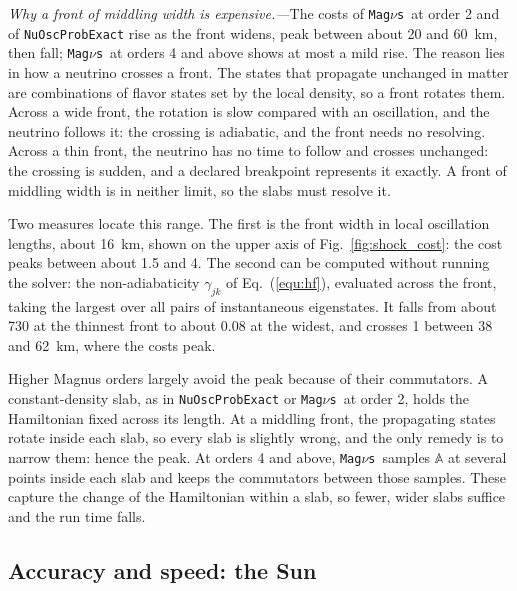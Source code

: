 \documentclass[final,5p,times,twocolumn,sort,compress]{elsarticle}
\makeatletter
\newcommand{\eq}{Eq.}
\newcommand{\fig}{Fig.}
\DeclareRobustCommand{\_}{%
  \ifmmode\nfss@text{\textunderscore}\else\textunderscore\allowbreak\fi}
\newcommand{\equ}[1]{\eq~(\ref{equ:#1})}
\newcommand{\figu}[1]{\fig~\ref{fig:#1}}
\newcommand{\magnus}{{\tt Mag}\ensuremath{\nu}{\tt s}}
\makeatother
\begin{document}
\smallskip

\textit{Why a front of middling width is expensive.---}The costs of \magnus\ at order 2 and of {\tt NuOscProbExact} rise as the front widens, peak between about 20 and 60~km, then fall; \magnus\ at orders 4 and above shows at most a mild rise. The reason lies in how a neutrino crosses a front. The states that propagate unchanged in matter are combinations of flavor states set by the local density, so a front rotates them. Across a wide front, the rotation is slow compared with an oscillation, and the neutrino follows it: the crossing is adiabatic, and the front needs no resolving. Across a thin front, the neutrino has no time to follow and crosses unchanged: the crossing is sudden, and a declared breakpoint represents it exactly. A front of middling width is in neither limit, so the slabs must resolve it.

Two measures locate this range. The first is the front width in local oscillation lengths, about 16~km, shown on the upper axis of \figu{shock_cost}: the cost peaks between about 1.5 and 4. The second can be computed without running the solver: the non-adiabaticity $\gamma_{jk}$ of \equ{hf}, evaluated across the front, taking the largest over all pairs of instantaneous eigenstates. It falls from about 730 at the thinnest front to about 0.08 at the widest, and crosses 1 between 38 and 62~km, where the costs peak.

Higher Magnus orders largely avoid the peak because of their commutators. A constant-density slab, as in {\tt NuOscProbExact} or \magnus\ at order 2, holds the Hamiltonian fixed across its length. At a middling front, the propagating states rotate inside each slab, so every slab is slightly wrong, and the only remedy is to narrow them: hence the peak. At orders 4 and above, \magnus\ samples $\mathbb{A}$ at several points inside each slab and keeps the commutators between those samples. These capture the change of the Hamiltonian within a slab, so fewer, wider slabs suffice and the run time falls.


\subsection{Accuracy and speed: the Sun}
\label{sec:solar_comparison}
\end{document}
